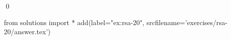 
\begin{ex} 
  \label{ex:rsa-20}
  
  \qed
\end{ex} 
\begin{python0}
from solutions import *
add(label="ex:rsa-20",
    srcfilename='exercises/rsa-20/answer.tex') 
\end{python0}
